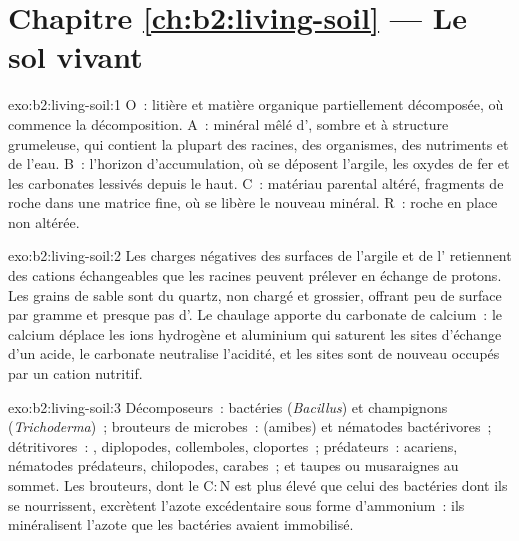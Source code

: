 \section*{Chapitre \ref{ch:b2:living-soil} --- Le sol vivant}

\begin{solution}{exo:b2:living-soil:1}
O~: litière et matière organique partiellement décomposée, où commence la
décomposition. A~:  minéral mêlé d', sombre et à structure
grumeleuse, qui contient la plupart des racines, des organismes, des
nutriments et de l'eau. B~: l'horizon d'accumulation, où se déposent
l'argile, les oxydes de fer et les carbonates lessivés depuis le haut.
C~: matériau parental altéré, fragments de roche dans une matrice fine,
où se libère le nouveau  minéral. R~: roche en place non altérée.
\end{solution}

\begin{solution}{exo:b2:living-soil:2}
Les charges négatives des surfaces de l'argile et de l' retiennent
des cations échangeables que les racines peuvent prélever en échange de
protons. Les grains de sable sont du quartz, non chargé et grossier,
offrant peu de surface par gramme et presque pas d'. Le chaulage
apporte du carbonate de calcium~: le calcium déplace les ions hydrogène
et aluminium qui saturent les sites d'échange d'un  acide, le
carbonate neutralise l'acidité, et les sites sont de nouveau occupés par
un cation nutritif.
\end{solution}

\begin{solution}{exo:b2:living-soil:3}
Décomposeurs~: bactéries (\emph{Bacillus}) et champignons
(\emph{Trichoderma})~; brouteurs de microbes~:  (amibes) et
nématodes bactérivores~; détritivores~: , diplopodes,
collemboles, cloportes~; prédateurs~: acariens, nématodes prédateurs,
chilopodes, carabes~; et taupes ou musaraignes au sommet. Les brouteurs,
dont le $\mathrm{C:N}$ est plus élevé que celui des bactéries dont ils se
nourrissent, excrètent l'azote excédentaire sous forme d'ammonium~: ils
minéralisent l'azote que les bactéries avaient immobilisé.
\end{solution}

